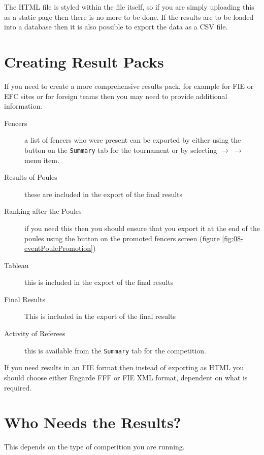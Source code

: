 \documentclass[a4paper,11pt]{memoir}
\begin{document}
The HTML file is styled within the file itself, so if you are simply uploading this as a static page then there is no more to be done. 
If the results are to be loaded into a database then it is also possible to export the data as a CSV file.

\section{Creating Result Packs}

If you need to create a more comprehensive results pack, for example for FIE or EFC sites or for foreign teams then you may need to provide additional information. 

\begin{description}
 \item[Fencers] a list of fencers who were present can be exported by either using the  button on the \texttt{Summary} tab for the tournament or by selecting  $\rightarrow$  $\rightarrow$  menu item.
 \item[Results of Poules] these are included in the export of the final results
 \item[Ranking after the Poules] if you need this then you should ensure that you export it at the end of the poules using the  button on the promoted fencers screen (figure \ref{fig:08-eventPoulePromotion})
 \item[Tableau] this is included in the export of the final results
 \item[Final Results] This is included in the export of the final results
 \item[Activity of Referees] this is available from the \texttt{Summary} tab for the competition.
\end{description}

If you need results in an FIE format then instead of exporting as HTML you should choose either Engarde FFF or FIE XML format, dependent on what is required.

\section{Who Needs the Results?}

This depends on the type of competition you are running.
\end{document}
